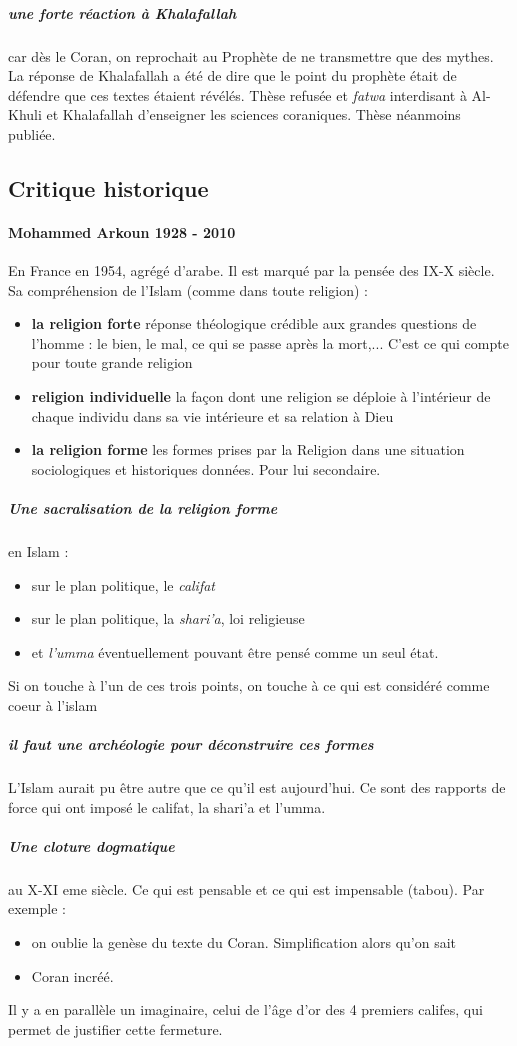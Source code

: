 \subparagraph{une forte réaction à Khalafallah} car dès le Coran, on reprochait au Prophète de ne transmettre que des mythes. La réponse de Khalafallah a été de dire que le point du prophète était de défendre que ces textes étaient révélés. Thèse refusée et \textit{fatwa} interdisant à Al-Khuli et Khalafallah d'enseigner les sciences coraniques. Thèse néanmoins publiée.


\subsection{Critique historique}

\paragraph{Mohammed Arkoun 1928 - 2010} \label{theol:Arkoun5} En France en 1954, agrégé d'arabe. Il est marqué par la pensée des IX-X siècle. Sa compréhension de l'Islam (comme dans toute religion) : 
\begin{itemize}
    \item \textbf{la religion forte} réponse théologique crédible aux grandes questions de l'homme : le bien, le mal, ce qui se passe après la mort,... C'est ce qui compte pour toute grande religion
    \item \textbf{religion individuelle} la façon dont une religion se déploie à l'intérieur de chaque individu dans sa vie intérieure et sa relation à Dieu
    \item \textbf{la religion forme} les formes prises par la Religion dans une situation sociologiques et historiques données. Pour lui secondaire. 
\end{itemize}

\subparagraph{Une sacralisation de la religion forme} en Islam :
\begin{itemize}
    \item sur le plan politique, le \textit{califat}
    \item sur le plan politique, la \textit{shari'a}, loi religieuse
    \item et \textit{l'umma} éventuellement pouvant être pensé comme un seul état.
\end{itemize}
Si on touche à l'un de ces trois points, on touche à ce qui est considéré comme coeur à l'islam

\subparagraph{il faut une archéologie pour déconstruire ces formes}  L'Islam aurait pu être autre que ce qu'il est aujourd'hui. Ce sont des rapports de force qui ont imposé le califat, la shari'a et l'umma. 
\subparagraph{Une cloture dogmatique} au X-XI eme siècle. Ce qui est pensable et ce qui est impensable (tabou). Par exemple :
\begin{itemize}
    \item on oublie la genèse du texte du Coran. Simplification alors qu'on sait
    \item Coran incréé.
\end{itemize}
Il y a en parallèle un imaginaire, celui de l'âge d'or des 4 premiers califes, qui permet de justifier cette fermeture.

